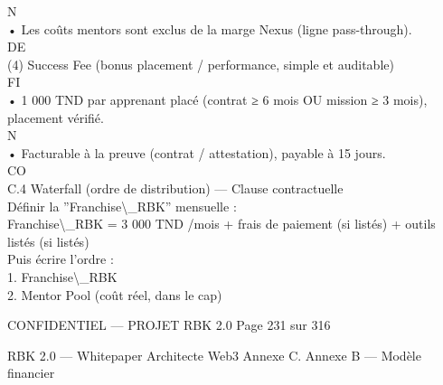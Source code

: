 \documentclass[12pt,landscape,a4paper]{article}
\newenvironment{confidential}
{\begin{tcolorbox}[
    colback=rbkred!5!white,
    colframe=rbkred!75!black,
    title=CONFIDENTIEL,
    fonttitle=\bfseries\color{white},
    coltitle=rbkred!75!black,
    breakable,
    enhanced,
    frame hidden,
    borderline west={2pt}{0pt}{rbkred!75!black}
]}
{\end{tcolorbox}}
\begin{document}
\vspace{0.5em}
N\\
• Les coûts mentors sont exclus de la marge Nexus (ligne pass-through).\\
\vspace{0.5em}
\vspace{0.5em}
\vspace{0.5em}
\vspace{0.5em}
DE\\
(4) Success Fee (bonus placement / performance, simple et auditable)\\
\vspace{0.5em}
\vspace{0.5em}
\vspace{0.5em}
\vspace{0.5em}
FI\\
• 1 000 TND par apprenant placé (contrat ≥ 6 mois OU mission ≥ 3 mois), placement vérifié.\\
\vspace{0.5em}
\vspace{0.5em}
\vspace{0.5em}
N\\
• Facturable à la preuve (contrat / attestation), payable à 15 jours.\\
CO\\
C.4 Waterfall (ordre de distribution) — Clause contractuelle\\
Définir la ”Franchise\textbackslash{}_RBK” mensuelle :\\
\vspace{0.5em}
Franchise\textbackslash{}_RBK = 3 000 TND /mois + frais de paiement (si listés) + outils listés (si listés)\\
\vspace{0.5em}
Puis écrire l’ordre :\\
\vspace{0.5em}
1. Franchise\textbackslash{}_RBK\\
\vspace{0.5em}
2. Mentor Pool (coût réel, dans le cap)\\
\vspace{0.5em}
\vspace{0.5em}
\vspace{0.5em}
\begin{confidential}CONFIDENTIEL — PROJET RBK 2.0                                               Page 231 sur 316\end{confidential}
RBK 2.0 — Whitepaper Architecte Web3                           Annexe C. Annexe B — Modèle financier\\
\end{document}
